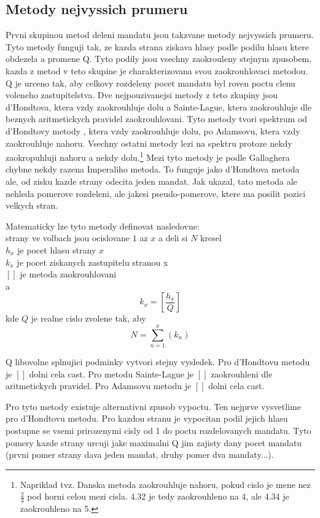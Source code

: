 \documentclass[12pt,a4paper]{report}
\begin{document}
\subsection{Metody nejvyssich prumeru}
Prvni skupinou metod deleni mandatu jsou takzvane metody nejvyssich prumeru.
Tyto metody funguji tak, ze kazda strana ziskava hlasy podle podilu hlasu ktere obdezela a promene Q.
Tyto podily jsou vsechny zaokrouleny stejnym zpusobem, kazda z metod v teto skupine je charakterizovana svou zaokrouhlovaci metodou.
Q je urceno tak, aby celkovy rozdeleny pocet mandatu byl roven poctu clenu voleneho zastupitelstva.
Dve nejpouzivanejsi metody z teto zkupiny jsou d'Hondtova, ktera vzdy zaokrouhluje dolu a Sainte-Lague, ktera zaokrouhluje dle beznych aritmetickych pravidel zaokrouhlovani.
Tyto metody tvori spektrum od d'Hondtovy metody , ktera vzdy zaokrouhluje dolu, po Adamsovu, ktera vzdy zaokrouhluje nahoru.
Vsechny ostatni metody lezi na spektru protoze nekdy zaokropuhluji nahoru a nekdy dolu.\footnote{Napriklad tvz. Danska metoda zaokrouhluje nahoru, pokud cislo je mene nez $\frac{2}{3}$ pod horni celou mezi cisla. 4.32 je tedy zaokrouhleno na 4, ale 4.34 je zaokrouhleno na 5.} 
Mezi tyto metody je podle Gallaghera chybne nekdy razena Imperaliho metoda.
To funguje jako d'Hondtova metoda ale, od zisku kazde strany odecita jeden mandat.
Jak ukazal, tato metoda ale nehleda pomerove rozdeleni, ale jakesi pseudo-pomerove, ktere ma posilit pozici velkych stran.
\autocite{GAL1}

Matematicky lze tyto metody definovat nasledovne:\\
strany ve volbach jsou ocislovane $1$ az $x$ a deli si $N$ kresel\\
$h_{x}$ je pocet hlasu strany $x$\\
$k_{x}$ je pocet ziskanych zastupitelu stranou x\\
$[]$ je metoda zaokrouhlovani\\
a
$$k_{x}=[\dfrac{h_{x}}{Q}]$$ kde $Q$ je realne cislo zvolene tak, aby $$N=\sum_{n=1}^{x} (k_{n})$$ 

Q libovolne splnujici podminky vytvori stejny vysledek.
Pro d'Hondtovu metodu je $[ ]$ dolni cela cast.
Pro metodu Sainte-Lague je $[ ]$ zaokrouhleni dle aritmetickych pravidel.
Pro Adamsovu metodu je $[ ]$ dolni cela cast.

Pro tyto metody existuje alternativni zpusob vypoctu.
Ten nejprve vysvetlime pro d'Hondtovu metodu.
Pro kazdou stranu je vypocitan podil jejich hlasu postupne se vsemi prirozenymi cisly od 1 do poctu rozdelovanych mandatu.
Tyto pomery kazde strany urcuji jake maximalni Q jim zajisty dany pocet mandatu (prvni pomer strany dava jeden mandat, druhy pomer dva mandaty...).
\end{document}
